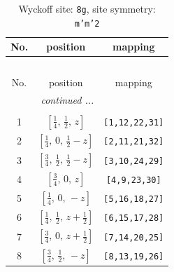 \documentclass[fleqn,8pt]{jsarticle}
\begin{document}
\begin{longtable}{ccc}
\caption{Wyckoff site: {\tt 8g}, site symmetry: {\tt m'm'2}}
 \\
 \hline \hline
No. & position & mapping \\ \hline \endfirsthead

\multicolumn{2}{l}{\tablename\ \thetable{}} \\
 \hline \hline
No. & position & mapping \\ \hline \endhead

 \hline \hline
\multicolumn{2}{r}{\footnotesize\it continued ...} \\ \endfoot

 \hline \hline
\multicolumn{2}{r}{} \\ \endlastfoot

1 & $\left[ \frac{1}{4},\, \frac{1}{2},\, z \right]$ & {\tt [1,12,22,31]} \\ \hline
2 & $\left[ \frac{1}{4},\, 0,\, \frac{1}{2} - z \right]$ & {\tt [2,11,21,32]} \\ \hline
3 & $\left[ \frac{3}{4},\, \frac{1}{2},\, \frac{1}{2} - z \right]$ & {\tt [3,10,24,29]} \\ \hline
4 & $\left[ \frac{3}{4},\, 0,\, z \right]$ & {\tt [4,9,23,30]} \\ \hline
5 & $\left[ \frac{1}{4},\, 0,\, - z \right]$ & {\tt [5,16,18,27]} \\ \hline
6 & $\left[ \frac{1}{4},\, \frac{1}{2},\, z + \frac{1}{2} \right]$ & {\tt [6,15,17,28]} \\ \hline
7 & $\left[ \frac{3}{4},\, 0,\, z + \frac{1}{2} \right]$ & {\tt [7,14,20,25]} \\ \hline
8 & $\left[ \frac{3}{4},\, \frac{1}{2},\, - z \right]$ & {\tt [8,13,19,26]} \\
\end{longtable}
\renewcommand{\arraystretch}{1.2}
\end{document}
